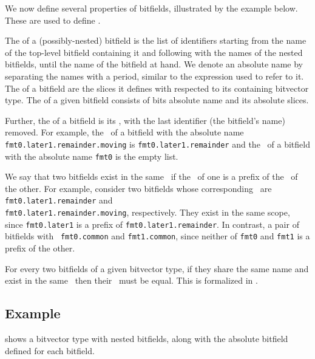 We now define several properties of bitfields, illustrated by the example below.
These are used to define .

The \hypertarget{def-absolutename}{\absolutename} of a (possibly-nested) bitfield is the list of identifiers starting from the
name of the top-level bitfield containing it and following with the names of the nested bitfields,
until the name of the bitfield at hand. We denote an absolute name by separating the names with a
period, similar to the expression used to refer to it.
%
The \hypertarget{def-absoluteslice}{\absoluteslice} of a bitfield are the slices it defines with respected to its containing
bitvector type.
%
The \hypertarget{def-absolutebitfield}{\absolutebitfield} of a given bitfield consists of bits absolute name and its
absolute slices.

Further, the \hypertarget{def-bitfieldscope}{\bitfieldscope} of a bitfield is its \absolutename, with the last
identifier (the bitfield's name) removed.
For example, the \bitfieldscope\ of a bitfield with the absolute name \texttt{fmt0.later1.remainder.moving}
is \texttt{fmt0.later1.remainder} and the \bitfieldscope\ of a bitfield with the absolute name
\texttt{fmt0} is the empty list.

We say that two bitfields exist in the same \bitfieldscope\ if the \bitfieldscope\ of one is a prefix
of the \bitfieldscope\ of the other. For example, consider two bitfields whose corresponding \absolutenames\ are
\texttt{fmt0.later1.remainder} and \\
\texttt{fmt0.later1.remainder.moving}, respectively.
They exist in the same scope, since \texttt{fmt0.later1} is a prefix of
\texttt{fmt0.later1.remainder}.
In contrast, a pair of bitfields with \absolutenames\ \texttt{fmt0.common}
and \texttt{fmt1.common}, since neither of \texttt{fmt0} and \texttt{fmt1} is a prefix of the other.

For every two bitfields of a given bitvector type,
if they share the same name and exist in the same \bitfieldscope\ then their \absoluteslices\ must be
equal.
This is formalized in .

\subsection{Example}
 shows a bitvector type with nested bitfields, along with the absolute bitfield
defined for each bitfield.

